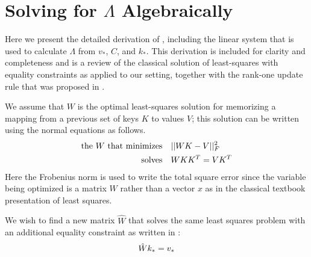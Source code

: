 \section{Solving for \texorpdfstring{$\Lambda$}{Lambda} Algebraically}
\label{apd:solving-v}
Here we present the detailed derivation of , including the linear system that is used to calculate $\Lambda$ from $v_*$, $C$, and $k_*$.  This derivation is included for clarity and completeness and is a review of the classical solution of least-squares with equality constraints as applied to our setting, together with the rank-one update rule that was proposed in \citet{bau-rewriting}.

We assume that $W$ is the optimal least-squares solution for memorizing a mapping from a previous set of keys $K$ to values $V$; this solution can be written using the normal equations as follows.
\begin{align}
\text{the $W$ that minimizes} \quad &|| W K - V ||_F^2 \\
\text{solves} \quad    & W K K^T = V K^T
\lbleq{normal-eq}
\end{align}
Here the Frobenius norm is used to write the total square error since the variable being optimized is a matrix $W$ rather than a vector $x$ as in the classical textbook presentation of least squares.

We wish to find a new matrix $\hat{W}$ that solves the same least squares problem with an additional equality constraint as written in :
\begin{align}
    \hat{W}k_* = v_*
    \lbleq{eq-constraint}
\end{align}

